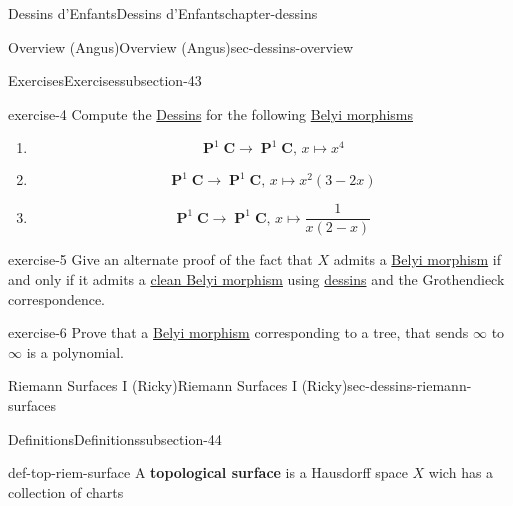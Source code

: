 \documentclass[oneside,10pt,]{book}
\newcommand{\terminology}[1]{\textbf{#1}}
\numberwithin{equation}{section}
\newcommand{\CC}{\mathbf{C}}
\DeclareMathOperator{\PP}{\mathbf{P}}
\begin{document}
\begin{chapterptx}{Dessins d'Enfants}{}{Dessins d'Enfants}{}{}{chapter-dessins}
\begin{sectionptx}{Overview (Angus)}{}{Overview (Angus)}{}{}{sec-dessins-overview}
\begin{subsectionptx}{Exercises}{}{Exercises}{}{}{subsection-43}
\begin{inlineexercise}{}{exercise-4}
Compute the \hyperref[def-dessin-denfant]{Dessins} for the following \hyperref[def-belyi-morphism]{Belyi morphisms}\leavevmode%
\begin{enumerate}
\item\hypertarget{li-98}{}%
\begin{equation*}
\PP^1\CC\to \PP^1\CC,\,x\mapsto x^4
\end{equation*}
%
\item\hypertarget{li-99}{}%
\begin{equation*}
\PP^1\CC\to \PP^1\CC,\,x\mapsto x^2(3-2x)
\end{equation*}
%
\item\hypertarget{li-100}{}%
\begin{equation*}
\PP^1\CC\to \PP^1\CC,\,x\mapsto \frac{1}{x(2-x)}
\end{equation*}
%
\end{enumerate}
%
\end{inlineexercise}
\begin{inlineexercise}{}{exercise-5}%
\hypertarget{p-479}{}%
Give an alternate proof of the fact that \(X\) admits a \hyperref[def-belyi-morphism]{Belyi morphism} if and only if it admits a \hyperref[def-belyi-morphism]{clean Belyi morphism} using \hyperref[def-dessin-denfant]{dessins} and the Grothendieck correspondence.%
\end{inlineexercise}
\begin{inlineexercise}{}{exercise-6}%
\hypertarget{p-480}{}%
Prove that a \hyperref[def-belyi-morphism]{Belyi morphism} corresponding to a tree, that sends \(\infty\) to \(\infty\) is a polynomial.%
\end{inlineexercise}
\end{subsectionptx}
\end{sectionptx}
%
%
\typeout{************************************************}
\typeout{************************************************}
%
\begin{sectionptx}{Riemann Surfaces I (Ricky)}{}{Riemann Surfaces I (Ricky)}{}{}{sec-dessins-riemann-surfaces}
%
%
\typeout{************************************************}
\typeout{************************************************}
%
\begin{subsectionptx}{Definitions}{}{Definitions}{}{}{subsection-44}
\begin{definition}{}{def-top-riem-surface}%
\hypertarget{p-481}{}%
A \terminology{topological surface} is a Hausdorff space \(X\) wich has a collection of charts%

\end{definition}
\end{subsectionptx}
\end{sectionptx}
\end{chapterptx}
\end{document}
